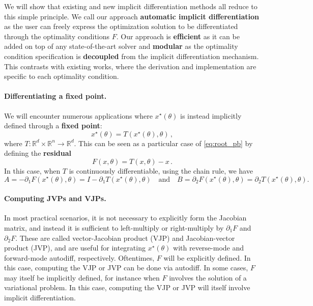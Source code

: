 \documentclass{article}
\def\RR{{\mathbb R}}
\begin{document}
We will show that existing and new implicit differentiation methods all reduce
to this simple principle.
We call our approach \textbf{automatic implicit differentiation}
as the user can freely express the optimization solution to be
differentiated through the optimality conditions $F$. 
Our approach is \textbf{efficient} as it can be added on top of
any state-of-the-art solver and \textbf{modular} as the optimality condition
specification is \textbf{decoupled} from the implicit differentiation mechanism.
This contrasts with existing works, where the derivation and implementation are
specific to each optimality condition.

\paragraph{Differentiating a fixed point.}

We will encounter numerous applications where $x^\star(\theta)$ is
instead implicitly defined through a \textbf{fixed point}:
\begin{equation}
    x^\star(\theta) = T(x^\star(\theta), \theta)\,,
\end{equation}
where $T \colon \RR^d \times \RR^n \to \RR^d$.
This can be seen as a particular case of \eqref{eq:root_pb} 
by defining the \textbf{residual}
\begin{equation}
F(x, \theta) = T(x, \theta) - x\,.
\label{eq:fixed_point_to_root}
\end{equation}
In this case, when $T$ is continuously differentiable, 
using the chain rule, we have
\begin{equation}
A = -\partial_1 F(x^\star(\theta), \theta) = 
I -\partial_1 T(x^\star(\theta), \theta)
\quad \text{and} \quad
B = \partial_2 F(x^\star(\theta), \theta) = 
\partial_2 T(x^\star(\theta), \theta).
\end{equation}

\paragraph{Computing JVPs and VJPs.}

In most practical scenarios, it is not necessary to explicitly form the Jacobian
matrix, and instead it is sufficient to left-multiply or right-multiply by
$\partial_1 F$ and $\partial_2 F$. These are called vector-Jacobian product
(VJP) and Jacobian-vector product
(JVP), and are useful for integrating $x^\star(\theta)$ with reverse-mode and
forward-mode autodiff, respectively.
Oftentimes, $F$ will be explicitly defined. In this case, computing the VJP or
JVP can be done via autodiff. 
In some cases, $F$ may itself be implicitly defined, for instance
when $F$ involves the solution of a variational problem. In this case, computing
the VJP or JVP will itself involve implicit differentiation.
\end{document}
